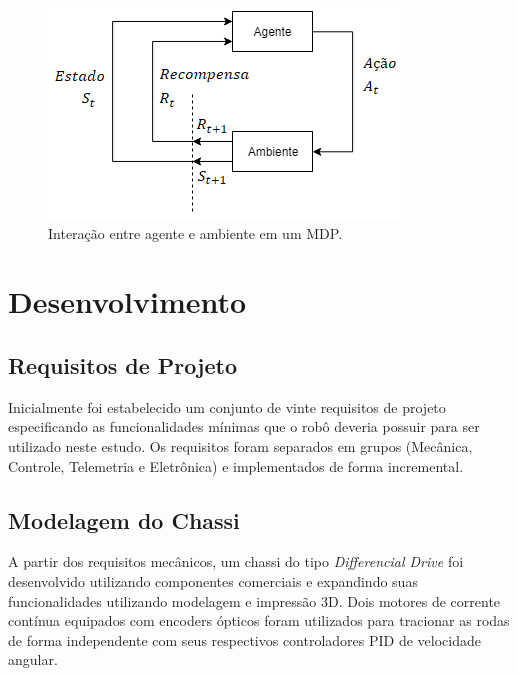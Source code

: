 \documentclass[a4paper]{ifacconf}
\begin{document}
\begin{figure}
\begin{center}
\includegraphics[scale=0.8]{Figuras/markov_proc.png}
\caption{Interação entre agente e ambiente em um MDP.}
\label{fig:markov_proc}
\end{center}
\end{figure}


\section{Desenvolvimento}
\subsection{Requisitos de Projeto}
Inicialmente foi estabelecido um conjunto de vinte requisitos de projeto especificando as funcionalidades mínimas que o robô deveria possuir para ser utilizado neste estudo. Os requisitos foram separados em grupos (Mecânica, Controle, Telemetria e Eletrônica) e implementados de forma incremental.

\subsection{Modelagem do Chassi}
A partir dos requisitos mecânicos, um chassi do tipo \emph{Differencial Drive} foi desenvolvido utilizando componentes comerciais e expandindo suas funcionalidades utilizando modelagem e impressão 3D. Dois motores de corrente contínua equipados com encoders ópticos foram utilizados para tracionar as rodas de forma independente com seus respectivos controladores PID de velocidade angular.
\end{document}

